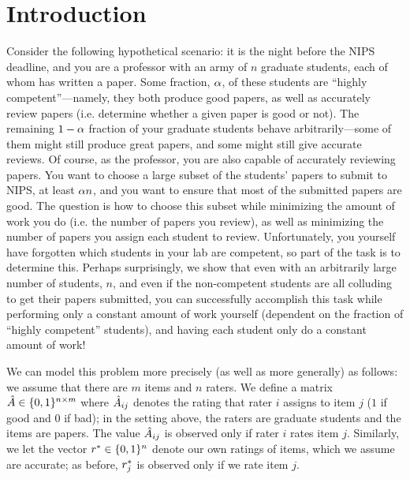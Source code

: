 \section{Introduction}
\label{sec:intro}

Consider the following hypothetical scenario: it is the night before the 
NIPS deadline, and you are a professor with an army of $n$ graduate students, 
each of whom has written a paper.  Some fraction, $\alpha$, of these 
students are ``highly competent''---namely, they both produce good papers, as 
well as accurately review papers (i.e. determine whether a given paper is good 
or not).  The remaining $1-\alpha$ fraction of your graduate students 
behave arbitrarily---some of them might still produce great papers, and some 
might still give accurate reviews.  Of course, as the professor, you are also 
capable of accurately reviewing papers.  You want to choose a large subset of 
the students' papers to submit to NIPS, at least $\alpha n$, and you want 
to ensure that most of the submitted papers are good.  The question is how to 
choose this subset while minimizing the amount of work you do (i.e. the number 
of papers you review), as well as minimizing the number of papers you assign 
each student to review. Unfortunately, you yourself have forgotten which students 
in your lab are competent, so part of the task is to determine this.
%
Perhaps surprisingly, we show that even with an arbitrarily large number of 
students, $n$, and even if the non-competent students are all colluding to 
get their papers submitted, you can successfully accomplish this task while 
performing only a constant amount of work yourself (dependent on the fraction 
of ``highly competent'' students), and having each student only do a constant 
amount of work!

We can model this problem more precisely (as well as more generally) as follows: 
we assume that there are $m$ items and $n$ raters. We define a matrix 
$\hat{A} \in \{0,1\}^{n \times m}$ where $\hat{A}_{ij}$ denotes the rating that 
rater $i$ assigns to item $j$ ($1$ if good and $0$ if bad); in the setting above, 
the raters are graduate students and the items are papers. 
The value $\hat{A}_{ij}$ is observed only if rater $i$ rates item $j$. 
Similarly, we let the vector $r^* \in \{0,1\}^n$ denote 
our own ratings of items, which we assume are accurate; as before, 
$r^*_{j}$ is observed only if we rate item $j$.

